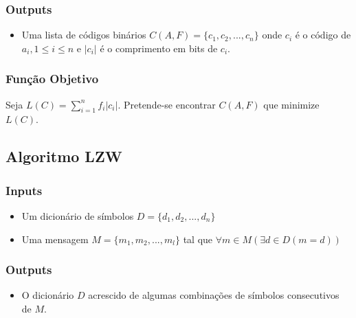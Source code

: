 \documentclass[a4paper,12pt,titlepage]{article}
\begin{document}
\subsubsection*{Outputs}
\begin{itemize}
\item{Uma lista de códigos binários $C(A,F) = \{c_1, c_2, ..., c_n\}$ onde $c_i$ é o código de $a_i, 1 \leq i \leq n$ e $|c_i|$ é o comprimento em bits de $c_i$.}
\end{itemize}

\subsubsection*{Função Objetivo}
Seja $L(C)=\displaystyle\sum_{i=1}^{n}f_i |c_i|$. Pretende-se encontrar $C(A,F)$ que minimize $L(C)$.
\subsection{Algoritmo LZW}
\subsubsection*{Inputs}
\begin{itemize}
\item{Um dicionário de símbolos $D = \{d_1, d_2, ..., d_n\}$}
\item{Uma mensagem $M=\{m_1, m_2, ..., m_l\}$ tal que $\forall m \in M (\exists d \in D(m = d))$}
\end{itemize}
\subsubsection*{Outputs}
\begin{itemize}
\item{O dicionário $D$ acrescido de algumas combinações de símbolos consecutivos de $M$.}
\end{itemize}
\newpage
\end{document}
